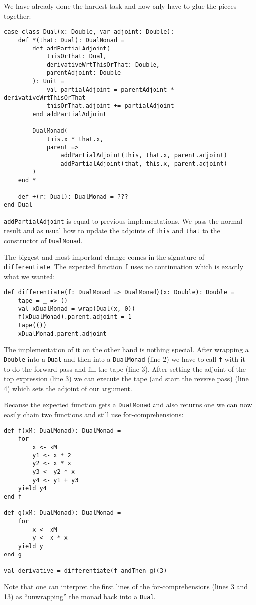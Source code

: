 We have already done the hardest task and now only have to glue the pieces together:
\begin{lstlisting}
case class Dual(x: Double, var adjoint: Double):
    def *(that: Dual): DualMonad =
        def addPartialAdjoint(
            thisOrThat: Dual,
            derivativeWrtThisOrThat: Double,
            parentAdjoint: Double
        ): Unit =
            val partialAdjoint = parentAdjoint * derivativeWrtThisOrThat
            thisOrThat.adjoint += partialAdjoint
        end addPartialAdjoint

        DualMonad(
            this.x * that.x,
            parent =>
                addPartialAdjoint(this, that.x, parent.adjoint)
                addPartialAdjoint(that, this.x, parent.adjoint)
        )
    end *

    def +(r: Dual): DualMonad = ???
end Dual
\end{lstlisting}
\lstinline{addPartialAdjoint} is equal to previous implementations. We pass the normal result and as usual how to update the adjoints of \lstinline{this} and \lstinline{that} to the constructor of \lstinline{DualMonad}.

The biggest and most important change comes in the signature of \lstinline{differentiate}. The expected function \lstinline{f} uses no continuation which is exactly what we wanted:
\begin{lstlisting}
def differentiate(f: DualMonad => DualMonad)(x: Double): Double =
    tape = _ => ()
    val xDualMonad = wrap(Dual(x, 0))
    f(xDualMonad).parent.adjoint = 1
    tape(())
    xDualMonad.parent.adjoint
\end{lstlisting}
The implementation of it on the other hand is nothing special. After wrapping a \lstinline{Double} into a \lstinline{Dual} and then into a \lstinline{DualMonad} (line 2) we have to call \lstinline{f} with it to do the forward pass and fill the tape (line 3). After setting the adjoint of the top expression (line 3) we can execute the tape (and start the reverse pass) (line 4) which sets the adjoint of our argument.

Because the expected function gets a \lstinline{DualMonad} and also returns one we can now easily chain two functions and still use for-comprehensions:
\begin{lstlisting}
def f(xM: DualMonad): DualMonad =
    for
        x <- xM
        y1 <- x * 2
        y2 <- x * x
        y3 <- y2 * x
        y4 <- y1 + y3
    yield y4
end f

def g(xM: DualMonad): DualMonad =
    for
        x <- xM
        y <- x * x
    yield y
end g

val derivative = differentiate(f andThen g)(3)
\end{lstlisting}
Note that one can interpret the first lines of the for-comprehensions (lines 3 and 13) as ``unwrapping'' the monad back into a \lstinline{Dual}.